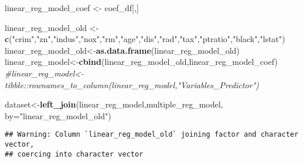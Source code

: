 \documentclass[]{article}
\newenvironment{Shaded}{\begin{snugshade}}{\end{snugshade}}
\newcommand{\CommentTok}[1]{\textcolor[rgb]{0.56,0.35,0.01}{\textit{#1}}}
\newcommand{\DataTypeTok}[1]{\textcolor[rgb]{0.13,0.29,0.53}{#1}}
\newcommand{\KeywordTok}[1]{\textcolor[rgb]{0.13,0.29,0.53}{\textbf{#1}}}
\newcommand{\NormalTok}[1]{#1}
\newcommand{\OperatorTok}[1]{\textcolor[rgb]{0.81,0.36,0.00}{\textbf{#1}}}
\newcommand{\StringTok}[1]{\textcolor[rgb]{0.31,0.60,0.02}{#1}}
\begin{document}
\begin{Shaded}
\begin{Highlighting}[]
\NormalTok{linear_reg_model_coef <-}\StringTok{ }\NormalTok{coef_df[,]}

\NormalTok{linear_reg_model_old <-}\StringTok{ }\KeywordTok{c}\NormalTok{(}\StringTok{"crim"}\NormalTok{,}\StringTok{"zn"}\NormalTok{,}\StringTok{"indus"}\NormalTok{,}\StringTok{"nox"}\NormalTok{,}\StringTok{"rm"}\NormalTok{,}\StringTok{"age"}\NormalTok{,}\StringTok{"dis"}\NormalTok{,}\StringTok{"rad"}\NormalTok{,}\StringTok{"tax"}\NormalTok{,}\StringTok{"ptratio"}\NormalTok{,}\StringTok{"black"}\NormalTok{,}\StringTok{"lstat"}\NormalTok{)}
\NormalTok{linear_reg_model_old<-}\KeywordTok{as.data.frame}\NormalTok{(linear_reg_model_old)}
\NormalTok{linear_reg_model<-}\KeywordTok{cbind}\NormalTok{(linear_reg_model_old,linear_reg_model_coef)}
\CommentTok{#linear_reg_model<-tibble::rownames_to_column(linear_reg_model,"Variables_Predictor")}

\NormalTok{dataset<-}\KeywordTok{left_join}\NormalTok{(linear_reg_model,multiple_reg_model, }\DataTypeTok{by=}\StringTok{"linear_reg_model_old"}\NormalTok{)}
\end{Highlighting}
\end{Shaded}

\begin{verbatim}
## Warning: Column `linear_reg_model_old` joining factor and character vector,
## coercing into character vector
\end{verbatim}

\begin{Shaded}
\end{Shaded}
\end{document}
